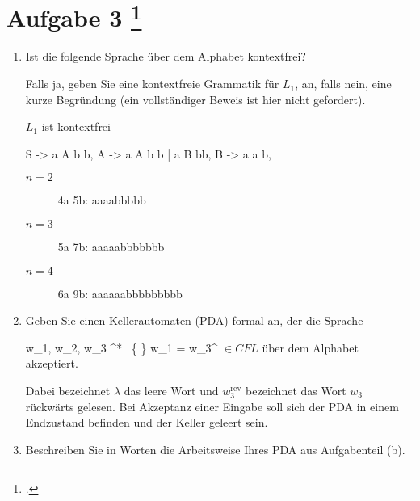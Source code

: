 \documentclass{lehramt-informatik-aufgabe}
\begin{document}
\section{Aufgabe 3
\footcite{66115:2020:03}}

\begin{enumerate}


\item Ist die folgende Sprache 
über dem Alphabet  kontextfrei?

Falls ja, geben Sie eine kontextfreie Grammatik für $L_1$, an, falls
nein, eine kurze Begründung (ein vollständiger Beweis ist hier nicht
gefordert).

\begin{liAntwort}
$L_1$ ist kontextfrei

\begin{liProduktionsRegeln}
S -> a A b b,
A -> a A b b | a B bb,
B -> a a b,
\end{liProduktionsRegeln}

\begin{description}
\item[$n = 2$] 4a 5b: aaaabbbbb
\item[$n = 3$] 5a 7b: aaaaabbbbbbb
\item[$n = 4$] 6a 9b: aaaaaabbbbbbbbb
\end{description}
\end{liAntwort}


\item Geben Sie einen Kellerautomaten (PDA) formal an, der die Sprache

{w_1, w_2, w_3 \in \Sigma^* \string\ \{ \lambda \}
w_1 = w_3^{}
} $\in CFL$
über dem Alphabet 
akzeptiert.

Dabei bezeichnet $\lambda$ das leere Wort und $w_3^{\text{rev}}$
bezeichnet das Wort $w_3$ rückwärts gelesen. Bei Akzeptanz einer Eingabe
soll sich der PDA in einem Endzustand befinden und der Keller geleert
sein.

\begin{liAntwort}
\end{liAntwort}


\item Beschreiben Sie in Worten die Arbeitsweise Ihres PDA aus
Aufgabenteil (b).

\end{enumerate}
\end{document}

